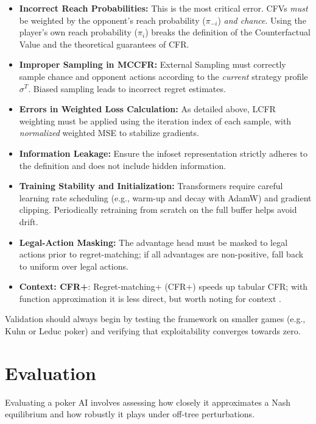 \documentclass[11pt,a4paper]{article}
\begin{document}
\begin{itemize}
    \item \textbf{Incorrect Reach Probabilities:} This is the most critical error. CFVs \textit{must} be weighted by the opponent's reach probability ($\pi_{-i}$) \emph{and chance}. Using the player's own reach probability ($\pi_{i}$) breaks the definition of the Counterfactual Value and the theoretical guarantees of CFR.
    \item \textbf{Improper Sampling in MCCFR:} External Sampling must correctly sample chance and opponent actions according to the \textit{current} strategy profile $\sigma^T$. Biased sampling leads to incorrect regret estimates.
    \item \textbf{Errors in Weighted Loss Calculation:} As detailed above, LCFR weighting must be applied using the iteration index of each sample, with \emph{normalized} weighted MSE to stabilize gradients.
    \item \textbf{Information Leakage:} Ensure the infoset representation strictly adheres to the definition and does not include hidden information.
    \item \textbf{Training Stability and Initialization:} Transformers require careful learning rate scheduling (e.g., warm-up and decay with AdamW) and gradient clipping. Periodically retraining from scratch on the full buffer helps avoid drift.
    \item \textbf{Legal-Action Masking:} The advantage head must be masked to legal actions prior to regret-matching; if all advantages are non-positive, fall back to uniform over legal actions.
    \item \textbf{Context: CFR+}: Regret-matching+ (CFR+) speeds up tabular CFR; with function approximation it is less direct, but worth noting for context \cite{tammelin2014cfrplus}.
\end{itemize}

Validation should always begin by testing the framework on smaller games (e.g., Kuhn or Leduc poker) and verifying that exploitability converges towards zero.

\section{Evaluation}

Evaluating a poker AI involves assessing how closely it approximates a Nash equilibrium and how robustly it plays under off-tree perturbations.
\end{document}
